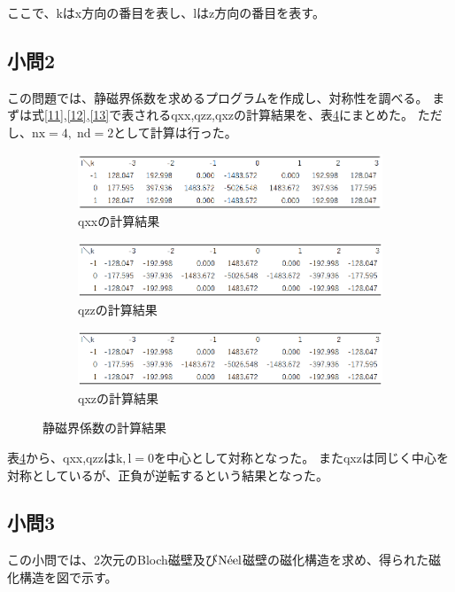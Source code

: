 \documentclass{jsarticle}
\begin{document}
ここで、kはx方向の番目を表し、lはz方向の番目を表す。

\subsection{小問2}
この問題では、静磁界係数を求めるプログラムを作成し、対称性を調べる。
まずは式\ref{11},\ref{12},\ref{13}で表されるqxx,qzz,qxzの計算結果を、表\ref{fig03}にまとめた。
ただし、$\mathrm{nx}=4,\;\mathrm{nd}=2$として計算は行った。
\begin{figure}[H]
	\centering
	\begin{subfigure}{0.8\columnwidth}
		\centering
		\includegraphics[width=\columnwidth]{pic09.eps}
		\caption{qxxの計算結果}
		\label{fig03_1}
	\end{subfigure}
	\begin{subfigure}{0.8\columnwidth}
		\centering
		\includegraphics[width=\columnwidth]{pic10.eps}
		\caption{qzzの計算結果}
		\label{fig03_2}
	\end{subfigure}
	\begin{subfigure}{0.8\columnwidth}
		\centering
		\includegraphics[width=\columnwidth]{pic10.eps}
		\caption{qxzの計算結果}
		\label{fig03_3}
	\end{subfigure}
	\caption{静磁界係数の計算結果}
	\label{fig03}
\end{figure}

表\ref{fig03}から、qxx,qzzは$\mathrm{k,l}=0$を中心として対称となった。
またqxzは同じく中心を対称としているが、正負が逆転するという結果となった。

\subsection{小問3}
この小問では、2次元のBloch磁壁及び$\mathrm{N\Acute{e}el}$磁壁の磁化構造を求め、得られた磁化構造を図で示す。
\end{document}
